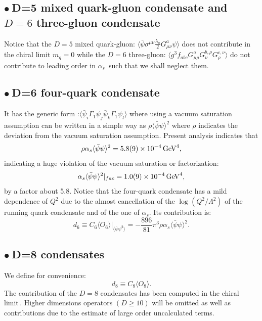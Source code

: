 \documentclass[review]{elsarticle}
\def\beq{\begin{equation}}
\def\eeq{\end{equation}}
\def\la{\langle}
\def\ra{\rangle}
\def\b{$\bullet~$}
\begin{document}
\subsection*{\b  D=5 mixed quark-gluon condensate and $D=6$ three-gluon condensate}
Notice that the $D=5$ mixed quark-gluon: $\la\bar\psi\sigma^{\mu\nu}\frac{\lambda_a}{2}G_{\mu\nu}^a\psi\ra$ does not contribute in the chiral limit $m_q=0$ while the
$D=6$  three-gluon:   $ \la g^3f_{abc} G^a_{\mu\rho}G^{b,\rho}_{\nu}G^{c,\nu}_\rho\ra$ do not contribute to leading order in $\alpha_s$\,\cite{MALLIK} such that we shall neglect them.

\subsection*{\b  D=6 four-quark condensate }
It has the generic form :$\la\bar\psi_i\Gamma_1\psi_j\bar\psi_k\Gamma_1\psi_l\ra$ where using a  vacuum saturation 
assumption can be written in a simple way as $\rho\la\bar\psi\psi\ra^2 $ where $\rho$ indicates the deviation from the vacuum saturation assumption. Present analysis indicates that 
\beq
\rho\alpha_s\la\bar\psi\psi\ra^2 = 5.8(9)\times 10^{-4}\,{\rm GeV}^4,
\label{eq:psi2}
\eeq
indicating a huge violation of the vacuum saturation or factorization:
\beq
\alpha_s\la\bar\psi\psi\ra^2\vert_{fac} = 1.0(9)\times 10^{-4}\,{\rm GeV}^4,
\label{eq:fac}
\eeq
by a factor about 5.8. Notice that the four-quark condensate has a mild dependence of $Q^2$ due to the almost cancellation of the $\log(Q^2/\Lambda^2)$ of the running quark condensate and of the one of $\alpha_s$. Its contribution is:
\beq
d_6\equiv C_6\la O_6\ra\vert_{\la\bar\psi\psi^2\ra}= -\frac{896}{81}\pi^3\rho\alpha_s\la\bar \psi\psi\ra^2.
\label{eq:d6}
\eeq
\subsection*{\b  D=8  condensates }
We define for convenience:
\beq
d_8\equiv  C_8\la O_8\ra.
\label{eq:d8}
\eeq
The contribution of the $D=8$ condensates has been computed in the chiral limit\,\cite{BROAD8}. Higher dimensions operators $(D\geq 10)$ will be omitted as well as contributions due to the estimate of large order uncalculated terms. 

\end{document}
